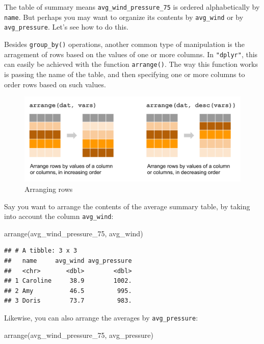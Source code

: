 \documentclass[
]{book}
\newenvironment{Shaded}{\begin{snugshade}}{\end{snugshade}}
\newcommand{\FunctionTok}[1]{\textcolor[rgb]{0.00,0.00,0.00}{#1}}
\newcommand{\NormalTok}[1]{#1}
\begin{document}
The table of summary means \texttt{avg\_wind\_pressure\_75} is ordered alphabetically by
\texttt{name}. But perhaps you may want to organize its contents by \texttt{avg\_wind} or by
\texttt{avg\_pressure}. Let's see how to do this.

Besides \texttt{group\_by()} operations, another common type of manipulation is the
arragement of rows based on the values of one or more columns. In \texttt{"dplyr"},
this can easily be achieved with the function \texttt{arrange()}. The way this function
works is passing the name of the table, and then specifying one or more columns
to order rows based on such values.

\begin{figure}

{\centering \includegraphics[width=0.85\linewidth]{images/dplyr-arrange} 

}

\caption{Arranging rows}\label{fig:unnamed-chunk-26}
\end{figure}

Say you want to arrange the contents of the average summary table, by taking
into account the column \texttt{avg\_wind}:

\begin{Shaded}
\begin{Highlighting}[]
\FunctionTok{arrange}\NormalTok{(avg\_wind\_pressure\_75, avg\_wind)}
\end{Highlighting}
\end{Shaded}

\begin{verbatim}
## # A tibble: 3 x 3
##   name     avg_wind avg_pressure
##   <chr>       <dbl>        <dbl>
## 1 Caroline     38.9        1002.
## 2 Amy          46.5         995.
## 3 Doris        73.7         983.
\end{verbatim}

Likewise, you can also arrange the averages by \texttt{avg\_pressure}:

\begin{Shaded}
\begin{Highlighting}[]
\FunctionTok{arrange}\NormalTok{(avg\_wind\_pressure\_75, avg\_pressure)}
\end{Highlighting}
\end{Shaded}
\end{document}
